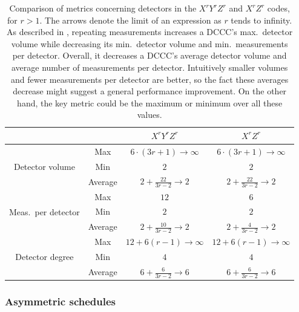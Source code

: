 \begingroup
\renewcommand*{\arraystretch}{1.5}
\begin{table}[tb]
    \centering
    \begin{tabular}{|c|c|c|c|}
        \hline
        & & $X^r Y^r Z^r$ & $X^r Z^r$ \\
        \hline
        \multirow{3}{*}{Detector volume} & Max & $6 \cdot (3r + 1) \to \infty$ & $6 \cdot (3r + 1) \to \infty$ \\
        \cline{2-4}
        & Min & $2$ & $2$ \\
        \cline{2-4}
        & Average & $2 + \frac{22}{3r - 2} \to 2$ & $2 + \frac{22}{3r - 2} \to 2$ \\
        \hline
        \multirow{3}{*}{Meas.\ per detector} & Max & $12$ & $6$ \\
        \cline{2-4}
        & Min & $2$ & $2$ \\
        \cline{2-4}
        & Average & $2 + \frac{10}{3r - 2} \to 2$ & $2 + \frac{4}{3r - 2} \to 2$ \\
        \hline
        \multirow{3}{*}{Detector degree} & Max & $12 + 6(r-1) \to \infty$ & $12 + 6(r-1) \to \infty$ \\
        \cline{2-4}
        & Min & $4$ & $4$ \\
        \cline{2-4}
        & Average & $6 + \frac{6}{3r - 2} \to 6$ & $6 + \frac{6}{3r - 2} \to 6$ \\
        \hline
    \end{tabular}
    \caption{
        Comparison of metrics concerning detectors in the $X^r Y^r Z^r$ and $X^r Z^r$ codes, for $r > 1$.
        The arrows denote the limit of an expression as $r$ tends to infinity.
        As described in , repeating measurements increases a DCCC's max.\ detector volume while decreasing its min.\ detector volume and min.\ measurements per detector.
        Overall, it decreases a DCCC's average detector volume and average number of measurements per detector.
        Intuitively smaller volumes and fewer measurements per detector are better,
        so the fact these averages decrease might suggest a general performance improvement.
        On the other hand, the key metric could be the maximum or minimum over all these values.
    }
    \label{tab:repeated_xyz_css_averages}
\end{table}
\endgroup

\subsubsection{Asymmetric schedules}\label{subsubsec:repeating_measurements_asymmetric_schedules}

